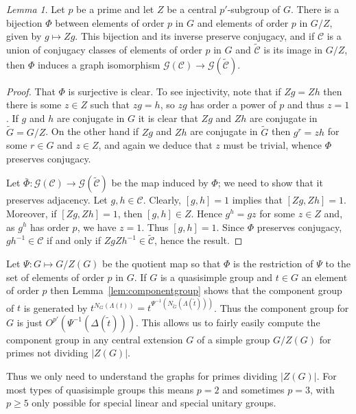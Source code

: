 \documentclass[11pt,a4paper]{amsart}
\theoremstyle{plain}
\theoremstyle{definition}
\theoremstyle{remark}
\newtheorem{lemma}[definition]{Lemma}
\theoremstyle{remark}
\theoremstyle{remark}
\theoremstyle{definition}
\newcommand{\GG}{\mathcal{G}}
\begin{document}
\begin{lemma}\label{lem:pnotcenter} Let $p$ be a prime and let $Z$ be a central $p'$-subgroup of $G$. There is a bijection $\Phi$ between elements of order $p$ in $G$ and elements of order $p$ in $G/Z$, given by $g\mapsto Zg$. This bijection and its inverse preserve conjugacy, and if $\mathcal C$ is a union of conjugacy classes of elements of order $p$ in $G$ and $\widetilde{\mathcal C}$ is its image in $G/Z$, then $\Phi$ induces a graph isomorphism $\GG(\mathcal C)\to \GG(\widetilde{\mathcal C})$.
\end{lemma}
\begin{proof} That $\Phi$ is surjective is clear. To see injectivity, note that if $Zg=Zh$ then there is some $z\in Z$ such that $zg=h$, so $zg$ has order a power of $p$ and thus $z=1$. If $g$ and $h$ are conjugate in $G$ it is clear that $Zg$ and $Zh$ are conjugate in $\widetilde{G}=G/Z$. On the other hand if $Zg$ and $Zh$ are conjugate in $\widetilde{G}$ then $g^r=zh$ for some $r\in G$ and $z\in Z$, and again we deduce that $z$ must be trivial, whence $\Phi$ preserves conjugacy.

Let $\bar{\Phi}:\GG(\mathcal{C})\to\GG(\widetilde{\mathcal{C}})$ be the map induced by $\Phi$; we need to show that it preserves adjacency. Let $g,h\in \mathcal{C}$. Clearly, $[g,h]=1$ implies that $[Zg,Zh]=1$. Moreover, if $[Zg,Zh]=1$, then $[g,h] \in Z$. Hence $g^h=gz$ for some $z\in Z$ and, as $g^h$ has order $p$, we have $z=1$. Thus $[g,h]=1$. Since $\Phi$ preserves conjugacy, $gh^{-1}\in\mathcal{C}$ if and only if $ZgZh^{-1}\in\widetilde{\mathcal{C}}$, hence the result.
\end{proof}

Let $\Psi:G\mapsto G/Z(G)$ be the quotient map so that $\Phi$ is the restriction of $\Psi$ to the set of elements of order $p$ in $G$. If $G$ is a quasisimple group and $t\in G$ an element of order $p$ then Lemma~\ref{lem:componentgroup} shows that the component group of $t$ %
is generated by $t^{N_G(\Lambda(t))}=t^{\Psi^{-1}(N_{\widetilde{G}}(\Lambda(\tilde{t})))}$. Thus the component group for $G$ is just $O^{p'}(\Psi^{-1}(\Delta(\tilde{t})))$. This allows us to fairly easily compute the component group in any central extension $G$ of a simple group $G/Z(G)$ for primes not dividing $|Z(G)|$.

Thus we only need to understand the graphs for primes dividing $|Z(G)|$. For most types of quasisimple groups this means $p=2$ and sometimes $p=3$, with $p\geq 5$ only possible for special linear and special unitary groups.
\end{document}
